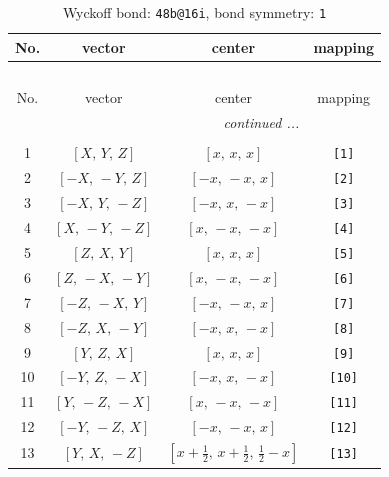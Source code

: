 \documentclass[fleqn,8pt]{jsarticle}
\begin{document}
\begin{longtable}{cccc}
\caption{Wyckoff bond: {\tt 48b@16i}, bond symmetry: {\tt 1}}
 \\
 \hline \hline
No. & vector & center & mapping \\ \hline \endfirsthead

\multicolumn{3}{l}{\tablename\ \thetable{}} \\
 \hline \hline
No. & vector & center & mapping \\ \hline \endhead

 \hline \hline
\multicolumn{3}{r}{\footnotesize\it continued ...} \\ \endfoot

 \hline \hline
\multicolumn{3}{r}{} \\ \endlastfoot

1 & $\left[ X,\, Y,\, Z \right]$ & $\left[ x,\, x,\, x \right]$ & {\tt [1]} \\ \hline
2 & $\left[ - X,\, - Y,\, Z \right]$ & $\left[ - x,\, - x,\, x \right]$ & {\tt [2]} \\ \hline
3 & $\left[ - X,\, Y,\, - Z \right]$ & $\left[ - x,\, x,\, - x \right]$ & {\tt [3]} \\ \hline
4 & $\left[ X,\, - Y,\, - Z \right]$ & $\left[ x,\, - x,\, - x \right]$ & {\tt [4]} \\ \hline
5 & $\left[ Z,\, X,\, Y \right]$ & $\left[ x,\, x,\, x \right]$ & {\tt [5]} \\ \hline
6 & $\left[ Z,\, - X,\, - Y \right]$ & $\left[ x,\, - x,\, - x \right]$ & {\tt [6]} \\ \hline
7 & $\left[ - Z,\, - X,\, Y \right]$ & $\left[ - x,\, - x,\, x \right]$ & {\tt [7]} \\ \hline
8 & $\left[ - Z,\, X,\, - Y \right]$ & $\left[ - x,\, x,\, - x \right]$ & {\tt [8]} \\ \hline
9 & $\left[ Y,\, Z,\, X \right]$ & $\left[ x,\, x,\, x \right]$ & {\tt [9]} \\ \hline
10 & $\left[ - Y,\, Z,\, - X \right]$ & $\left[ - x,\, x,\, - x \right]$ & {\tt [10]} \\ \hline
11 & $\left[ Y,\, - Z,\, - X \right]$ & $\left[ x,\, - x,\, - x \right]$ & {\tt [11]} \\ \hline
12 & $\left[ - Y,\, - Z,\, X \right]$ & $\left[ - x,\, - x,\, x \right]$ & {\tt [12]} \\ \hline
13 & $\left[ Y,\, X,\, - Z \right]$ & $\left[ x + \frac{1}{2},\, x + \frac{1}{2},\, \frac{1}{2} - x \right]$ & {\tt [13]} \\ \hline

\end{longtable}
\end{document}
